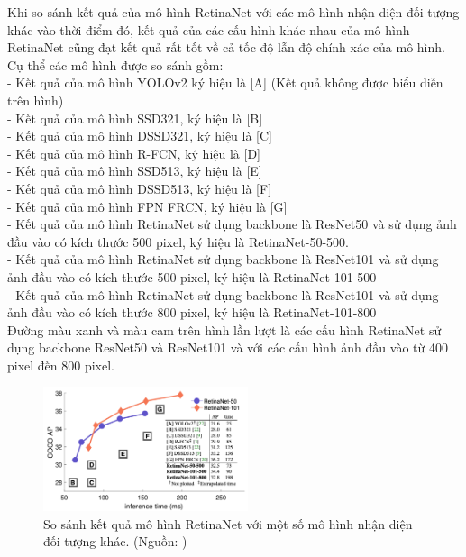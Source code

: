 {    Khi so sánh kết quả của mô hình RetinaNet với các mô hình nhận diện đối tượng khác vào thời điểm đó, kết quả của các cấu hình khác nhau của mô hình RetinaNet cũng đạt kết quả rất tốt về cả tốc độ lẫn độ chính xác của mô hình.
    Cụ thể các mô hình được so sánh gồm: \\
    - Kết quả của mô hình YOLOv2 ký hiệu là [A] \cite{redmon2016yolo9000} (Kết quả không được biểu diễn trên hình) \\
    - Kết quả của mô hình SSD321, ký hiệu là [B] \cite{liu2016ssd} \\
    - Kết quả của mô hình DSSD321, ký hiệu là [C] \cite{fu2017dssd} \\
    - Kết quả của mô hình R-FCN, ký hiệu là [D] \cite{dai2016r} \\
    - Kết quả của mô hình SSD513, ký hiệu là [E] \cite{liu2016ssd} \\
    - Kết quả của mô hình DSSD513, ký hiệu là [F] \cite{fu2017dssd} \\
    - Kết quả của mô hình FPN FRCN, ký hiệu là [G] \cite{lin2017feature} \\
    - Kết quả của mô hình RetinaNet sử dụng backbone là ResNet50 và sử dụng ảnh đầu vào có kích thước 500 pixel, ký hiệu là RetinaNet-50-500. \\
    - Kết quả của mô hình RetinaNet sử dụng backbone là ResNet101 và sử dụng ảnh đầu vào có kích thước 500 pixel, ký hiệu là RetinaNet-101-500 \\
    - Kết quả của mô hình RetinaNet sử dụng backbone là ResNet101 và sử dụng ảnh đầu vào có kích thước 800 pixel, ký hiệu là RetinaNet-101-800 \\
    Đường màu xanh và màu cam trên hình lần lượt là các cấu hình RetinaNet sử dụng backbone ResNet50 và ResNet101 và với các cấu hình ảnh đầu vào từ 400 pixel đến 800 pixel.

    \begin{figure}[H]
        \centering
        \includegraphics[width=6cm] {images/retinanet_results_1}
        \caption{So sánh kết quả mô hình RetinaNet với một số mô hình nhận diện đối tượng khác. (Nguồn: \cite{lin2017focal})}
        \label{fig:retinanet_results_1}
    \end{figure}

}
